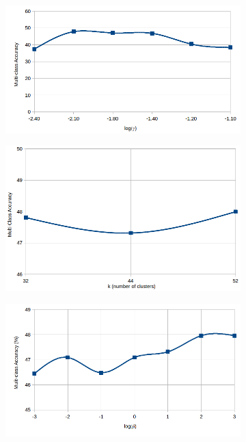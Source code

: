  \begin{figure}[!h]
  \centering
  \begin{subfigure}[b]{0.3\linewidth}
    \includegraphics[width=\linewidth]{images/simple_gamma}
    \caption{}
  \end{subfigure}
  \begin{subfigure}[b]{0.3\linewidth}
    \includegraphics[width=\linewidth]{images/simple_k}
    \caption{}
  \end{subfigure}
    \begin{subfigure}[b]{0.3\linewidth}
    \includegraphics[width=\linewidth]{images/simple_beta}

\end{subfigure}
\end{figure}
